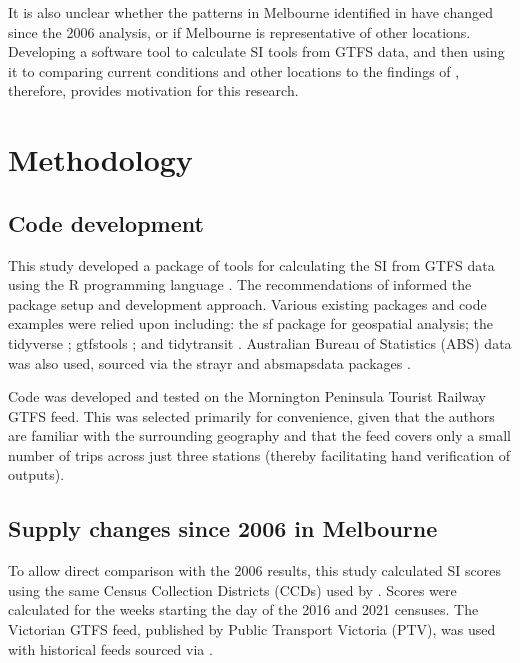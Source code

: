 \documentclass[preprint, 3p,
authoryear]{elsarticle} %
\begin{document}
It is also unclear whether the patterns in Melbourne identified in
\citet{currie2010identifying} have changed since the 2006 analysis, or
if Melbourne is representative of other locations. Developing a software
tool to calculate SI tools from GTFS data, and then using it to
comparing current conditions and other locations to the findings of
\citet{currie2010identifying}, therefore, provides motivation for this
research.

\hypertarget{methodology}{%
\section{Methodology}\label{methodology}}

\hypertarget{code-development}{%
\subsection{Code development}\label{code-development}}

This study developed a package of tools for calculating the SI from GTFS
data using the R programming language \citep{R-base}. The
recommendations of \citet{wickham2023r} informed the package setup and
development approach. Various existing packages and code examples were
relied upon including: the sf package \citep{R-sf} for geospatial
analysis; the tidyverse \citep{tidyverse2019}; gtfstools
\citep{R-gtfstools}; and tidytransit \citep{R-tidytransit}. Australian
Bureau of Statistics (ABS) data was also used, sourced via the strayr
and absmapsdata packages \citep{r-strayr}.

Code was developed and tested on the Mornington Peninsula Tourist
Railway GTFS feed. This was selected primarily for convenience, given
that the authors are familiar with the surrounding geography and that
the feed covers only a small number of trips across just three stations
(thereby facilitating hand verification of outputs).

\hypertarget{supply-changes-since-2006-in-melbourne}{%
\subsection{Supply changes since 2006 in
Melbourne}\label{supply-changes-since-2006-in-melbourne}}

To allow direct comparison with the 2006 results, this study calculated
SI scores using the same Census Collection Districts (CCDs) used by
\citet{currie2010identifying}. Scores were calculated for the weeks
starting the day of the 2016 and 2021 censuses. The Victorian GTFS feed,
published by Public Transport Victoria (PTV), was used with historical
feeds sourced via \citet{transitfeeds_victoria:2023aa}.
\end{document}

